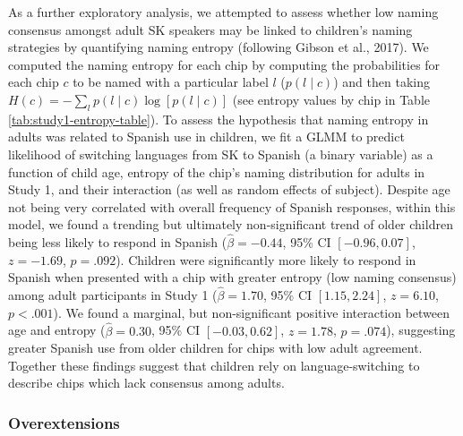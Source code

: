 \documentclass[
  english,
  ,apa7,floatsintext]{apa6}
\begin{document}
As a further exploratory analysis, we attempted to assess whether low naming consensus amongst adult SK speakers may be linked to children's naming strategies by quantifying naming entropy (following Gibson et al., 2017). We computed the naming entropy for each chip by computing the probabilities for each chip \(c\) to be named with a particular label \(l\) (\(p(l \mid c)\)) and then taking \(H(c) = -\sum_{l}{p(l\mid c) \log[p(l \mid c)]}\) (see entropy values by chip in Table \ref{tab:study1-entropy-table}).
To assess the hypothesis that naming entropy in adults was related to Spanish use in children, we fit a GLMM to predict likelihood of switching languages from SK to Spanish (a binary variable) as a function of child age, entropy of the chip's naming distribution for adults in Study 1, and their interaction (as well as random effects of subject). Despite age not being very correlated with overall frequency of Spanish responses, within this model, we found a trending but ultimately non-significant trend of older children being less likely to respond in Spanish (\(\hat{\beta} = -0.44\), 95\% CI \([-0.96, 0.07]\), \(z = -1.69\), \(p = .092\)). Children were significantly more likely to respond in Spanish when presented with a chip with greater entropy (low naming consensus) among adult participants in Study 1 (\(\hat{\beta} = 1.70\), 95\% CI \([1.15, 2.24]\), \(z = 6.10\), \(p < .001\)). We found a marginal, but non-significant positive interaction between age and entropy (\(\hat{\beta} = 0.30\), 95\% CI \([-0.03, 0.62]\), \(z = 1.78\), \(p = .074\)), suggesting greater Spanish use from older children for chips with low adult agreement. Together these findings suggest that children rely on language-switching to describe chips which lack consensus among adults.

\hypertarget{overextensions}{%
\subsubsection{Overextensions}\label{overextensions}}
\end{document}
